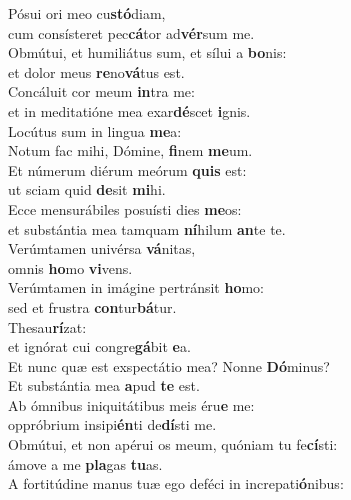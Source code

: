 \evenverse Pósui ori meo cu\textbf{stó}diam,~\*\\
\evenverse cum consísteret pec\textbf{cá}tor ad\textbf{vér}sum me.\\
\oddverse Obmútui, et humiliátus sum, et sílui a \textbf{bo}nis:~\*\\
\oddverse et dolor meus \textbf{re}no\textbf{vá}tus est.\\
\evenverse Concáluit cor meum \textbf{in}tra me:~\*\\
\evenverse et in meditatióne mea exar\textbf{dé}scet \textbf{i}gnis.\\
\oddverse Locútus sum in lingua \textbf{me}a:~\*\\
\oddverse Notum fac mihi, Dómine, \textbf{fi}nem \textbf{me}um.\\
\evenverse Et númerum diérum meórum \textbf{quis} est:~\*\\
\evenverse ut sciam quid \textbf{de}sit \textbf{mi}hi.\\
\oddverse Ecce mensurábiles posuísti dies \textbf{me}os:~\*\\
\oddverse et substántia mea tamquam \textbf{ní}hilum \textbf{an}te te.\\
\evenverse Verúmtamen univérsa \textbf{vá}nitas,~\*\\
\evenverse omnis \textbf{ho}mo \textbf{vi}vens.\\
\oddverse Verúmtamen in imágine pertránsit \textbf{ho}mo:~\*\\
\oddverse sed et frustra \textbf{con}tur\textbf{bá}tur.\\
\evenverse Thesau\textbf{rí}zat:~\*\\
\evenverse et ignórat cui congre\textbf{gá}bit \textbf{e}a.\\
\oddverse Et nunc quæ est exspectátio mea? Nonne \textbf{Dó}minus?~\*\\
\oddverse Et substántia mea \textbf{a}pud \textbf{te} est.\\
\evenverse Ab ómnibus iniquitátibus meis éru\textbf{e} me:~\*\\
\evenverse oppróbrium insipi\textbf{én}ti de\textbf{dí}sti me.\\
\oddverse Obmútui, et non apérui os meum, quóniam tu fe\textbf{cí}sti:~\*\\
\oddverse ámove a me \textbf{pla}gas \textbf{tu}as.\\
\evenverse A fortitúdine manus tuæ ego deféci in increpati\textbf{ó}nibus:~\*\\
